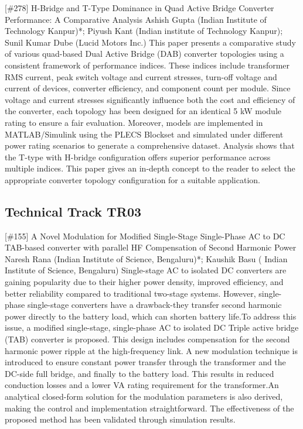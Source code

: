 {} \begin{abstract_online} {[\#278] H-Bridge and T-Type Dominance in Quad Active Bridge Converter Performance: A Comparative Analysis} {} {Ashish Gupta (Indian Institute of Technology Kanpur)*; Piyush Kant (Indian institute of Technology Kanpur); Sunil Kumar Dube (Lucid Motors Inc.)} {} This paper presents a comparative study of various quad-based Dual Active Bridge (DAB) converter topologies using a consistent framework of performance indices. These indices include transformer RMS current, peak switch voltage and current stresses, turn-off voltage and current of devices, converter efficiency, and component count per module. Since voltage and current stresses significantly influence both the cost and efficiency of the converter, each topology has been designed for an identical 5 kW module rating to ensure a fair evaluation. Moreover, models are implemented in MATLAB/Simulink using the PLECS Blockset and simulated under different power rating scenarios to generate a comprehensive dataset. Analysis shows that the T-type with H-bridge configuration offers superior performance across multiple indices. This paper gives an in-depth concept to the reader to select the appropriate converter topology configuration for a suitable application. \end{abstract_online} 
\clearpage \subsection{Technical Track TR03}\nopagebreak {} \begin{abstract_online} {[\#155] A Novel Modulation for Modified Single-Stage Single-Phase AC to DC TAB-based converter with parallel HF Compensation of Second Harmonic Power} {} {Naresh Rana (Indian Institute of Science, Bengaluru)*; Kaushik Basu ( Indian Institute of Science, Bengaluru)} {} Single-stage AC to isolated DC converters are gaining popularity due to their higher power density, improved efficiency, and better reliability compared to traditional two-stage systems. However, single-phase single-stage converters have a drawback-they transfer second harmonic power directly to the battery load, which can shorten battery life.To address this issue, a modified single-stage, single-phase AC to isolated DC Triple active bridge (TAB) converter is proposed. This design includes compensation for the second harmonic power ripple at the high-frequency link. A new modulation technique is introduced to ensure constant power transfer through the transformer and the DC-side full bridge, and finally to the battery load. This results in reduced conduction losses and a lower VA rating requirement for the transformer.An analytical closed-form solution for the modulation parameters is also derived, making the control and implementation straightforward. The effectiveness of the proposed method has been validated through simulation results. \end{abstract_online} 
